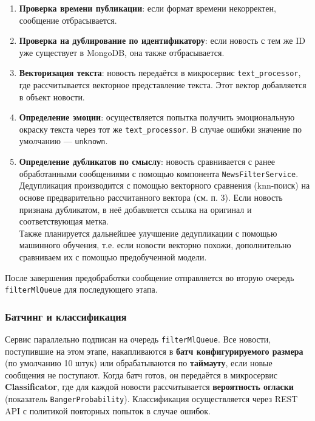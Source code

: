 \begin{enumerate}
\def\labelenumi{\arabic{enumi}.}
\tightlist
\item
  \textbf{Проверка времени публикации}: если формат времени некорректен,
  сообщение отбрасывается.\\
\item
  \textbf{Проверка на дублирование по идентификатору}: если новость с
  тем же ID уже существует в MongoDB, она также отбрасывается.\\
\item
  \textbf{Векторизация текста}: новость передаётся в микросервис
  \texttt{text\_processor}, где рассчитывается векторное представление
  текста. Этот вектор добавляется в объект новости.\\
\item
  \textbf{Определение эмоции}: осуществляется попытка получить
  эмоциональную окраску текста через тот же \texttt{text\_processor}. В
  случае ошибки значение по умолчанию --- \texttt{unknown}.\\
\item
  \textbf{Определение дубликатов по смыслу}: новость сравнивается с
  ранее обработанными сообщениями с помощью компонента
  \texttt{NewsFilterService}. Дедупликация производится с помощью
  векторного сравнения (knn-поиск) на основе предварительно
  рассчитанного вектора (см. п. 3). Если новость признана дубликатом, в
  неё добавляется ссылка на оригинал и соответствующая метка.\\
  Также планируется дальнейшее улучшение дедупликации с помощью
  машинного обучения, т.е. если новости векторно похожи, дополнительно
  сравниваем их с помощью предобученной модели.
\end{enumerate}

После завершения предобработки сообщение отправляется во вторую очередь
\texttt{filterMlQueue} для последующего этапа.

\hypertarget{ux431ux430ux442ux447ux438ux43dux433-ux438-ux43aux43bux430ux441ux441ux438ux444ux438ux43aux430ux446ux438ux44f}{%
\subsubsection{\texorpdfstring{\textbf{Батчинг и
классификация}}{Батчинг и классификация}}\label{ux431ux430ux442ux447ux438ux43dux433-ux438-ux43aux43bux430ux441ux441ux438ux444ux438ux43aux430ux446ux438ux44f}}

Сервис параллельно подписан на очередь \texttt{filterMlQueue}. Все
новости, поступившие на этом этапе, накапливаются в \textbf{батч
конфигурируемого размера} (по умолчанию 10 штук) или обрабатываются по
\textbf{таймауту}, если новые сообщения не поступают. Когда батч готов,
он передаётся в микросервис \textbf{Classificator}, где для каждой
новости рассчитывается \textbf{вероятность огласки} (показатель
\texttt{BangerProbability}). Классификация осуществляется через REST API
с политикой повторных попыток в случае ошибок.

